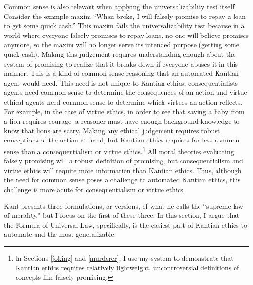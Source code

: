 \begin{isabellebody}
\begin{isamarkuptext}
Common sense is also relevant when applying the universalizability test itself. Consider the example
maxim ``When broke, I will falsely promise to repay a loan
to get some quick cash.'' This maxim fails the universalizability test because in a world where everyone
falsely promises to repay loans, no one will believe promises anymore, so the maxim will no longer serve
its intended purpose (getting some quick cash). Making this judgement requires understanding enough about
the system of promising to realize that it breaks down if everyone abuses it in this manner. This is a
kind of common sense reasoning that an automated Kantian agent would need. This need is not unique to
Kantian ethics; consequentialists agents need common sense to determine the consequences of 
an action and virtue ethical agents need common sense to determine which virtues an action
reflects. For example, in the case of virtue ethics, in order to see that saving a baby from a lion 
requires courage, a reasoner must have enough background knowledge to know that lions are scary. Making any 
ethical judgement requires robust conceptions of the action at hand, but Kantian ethics requires far less common sense 
than a consequentialism or virtue ethics.\footnote{
In Sections \ref{joking} and \ref{murderer}, I use my system to demonstrate that Kantian ethics requires relatively lightweight, uncontroversial definitions 
of concepts like falsely promising.} All
moral theories evaluating falsely promising will a robust definition of promising, 
but consequentialism and virtue ethics will require more information than Kantian ethics.
Thus, although the need for common sense poses a challenge to automated
Kantian ethics, this challenge is more acute for consequentialism or virtue ethics.%
\end{isamarkuptext}\isamarkuptrue%
%
\isadelimdocument
%
\endisadelimdocument
%
\isatagdocument
%
\isamarkuptrue%
%
\endisatagdocument
{\isafolddocument}%
%
\isadelimdocument
%
\endisadelimdocument
%
\begin{isamarkuptext}%
Kant presents three formulations, or versions, 
of what he calls the ``supreme law of morality," but I focus on the first of these three. In this section, 
I argue that the Formula of Universal Law, specifically, is the easiest part of Kantian ethics to automate
and the most generalizable.


\end{isamarkuptext}
\end{isabellebody}
